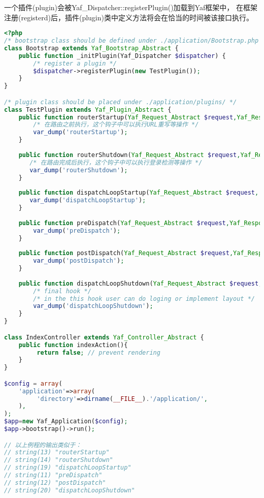 一个插件(plugin)会被Yaf\_Dispatcher::registerPlugin()加载到Yaf框架中， 在框架注册(registerd)后，插件(plugin)类中定义方法将会在恰当的时间被该接口执行。



\begin{lstlisting}[language=PHP]
<?php
/* bootstrap class should be defined under ./application/Bootstrap.php */
class Bootstrap extends Yaf_Bootstrap_Abstract {
    public function _initPlugin(Yaf_Dispatcher $dispatcher) {
        /* register a plugin */
        $dispatcher->registerPlugin(new TestPlugin());
    }
}

/* plugin class should be placed under ./application/plugins/ */
class TestPlugin extends Yaf_Plugin_Abstract {
    public function routerStartup(Yaf_Request_Abstract $request,Yaf_Response_Abstract $response) {
        /* 在路由之前执行，这个钩子中可以执行URL重写等操作 */
        var_dump('routerStartup');
    }
    
    public function routerShutdown(Yaf_Request_Abstract $request,Yaf_Response_Abstract $response) {
       /* 在路由完成后执行，这个钩子中可以执行登录检测等操作 */
       var_dump('routerShutdown');
    }
    
    public function dispatchLoopStartup(Yaf_Request_Abstract $request, Yaf_Response_Abstract $response) {
       var_dump('dispatchLoopStartup');
    }
    
    public function preDispatch(Yaf_Request_Abstract $request,Yaf_Response_Abstract $response) {
        var_dump('preDispatch');
    }
    
    public function postDispatch(Yaf_Request_Abstract $request,Yaf_Response_Abstract $response){
        var_dump('postDispatch');
    }
    
    public function dispatchLoopShutdown(Yaf_Request_Abstract $request,Yaf_Response_Abstract $response){
        /* final hook */
        /* in the this hook user can do loging or implement layout */
        var_dump('dispatchLoopShutdown');
    }
}

class IndexController extends Yaf_Controller_Abstract {
    public function indexAction(){
         return false; // prevent rendering
    }
}

$config = array(
    'application'=>array(
         'directory'=>dirname(__FILE__).'/application/',
    ),
);
$app=new Yaf_Application($config);
$app->bootstrap()->run();

// 以上例程的输出类似于：
// string(13) "routerStartup"
// string(14) "routerShutdown"
// string(19) "dispatchLoopStartup"
// string(11) "preDispatch"
// string(12) "postDispatch"
// string(20) "dispatchLoopShutdown"
\end{lstlisting}

